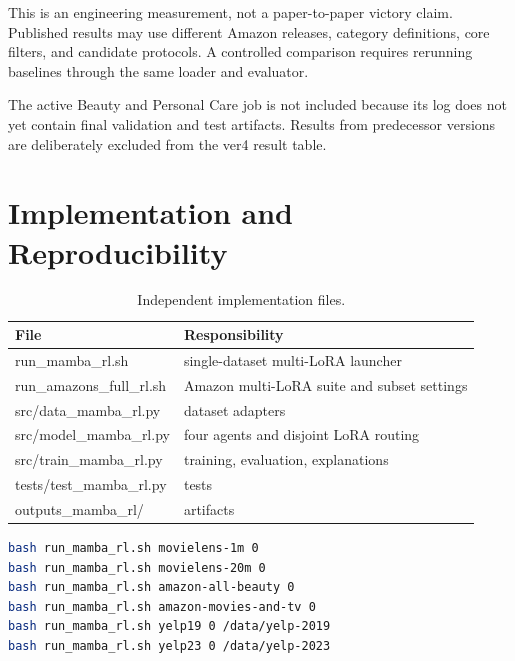 \documentclass[11pt,a4paper]{article}
\begin{document}
This is an engineering measurement, not a paper-to-paper victory claim.
Published results may use different Amazon releases, category definitions,
core filters, and candidate protocols. A controlled comparison requires
rerunning baselines through the same loader and evaluator.

The active Beauty and Personal Care job is not included because its log does
not yet contain final validation and test artifacts. Results from predecessor
versions are deliberately excluded from the ver4 result table.

\section{Implementation and Reproducibility}

\begin{table}[H]
\centering
\caption{Independent implementation files.}
\begin{tabularx}{\textwidth}{>{\ttfamily}p{}X}
\toprule
File & Responsibility\\
\midrule
run\_mamba\_rl.sh & single-dataset multi-LoRA launcher\\
run\_amazons\_full\_rl.sh & Amazon multi-LoRA suite and subset settings\\
src/data\_mamba\_rl.py & dataset adapters\\
src/model\_mamba\_rl.py & four agents and disjoint LoRA routing\\
src/train\_mamba\_rl.py & training, evaluation, explanations\\
tests/test\_mamba\_rl.py & tests\\
outputs\_mamba\_rl/ & artifacts\\
\bottomrule
\end{tabularx}
\end{table}

\begin{lstlisting}[language=bash]
bash run_mamba_rl.sh movielens-1m 0
bash run_mamba_rl.sh movielens-20m 0
bash run_mamba_rl.sh amazon-all-beauty 0
bash run_mamba_rl.sh amazon-movies-and-tv 0
bash run_mamba_rl.sh yelp19 0 /data/yelp-2019
bash run_mamba_rl.sh yelp23 0 /data/yelp-2023
\end{lstlisting}
\end{document}
